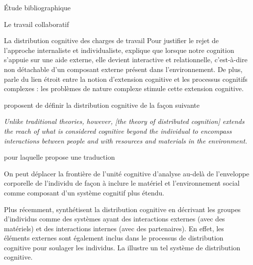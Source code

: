 \documentclass[myfrancais,ngerman,english,frenchb]{mythesis}
\begin{document}
\begin{mychapter}{Étude bibliographique}
\begin{mysection}{Le travail collaboratif}
\begin{mysubsection}{La distribution cognitive des charges de travail}
				Pour justifier le rejet de l'approche internaliste et individualiste,  explique que lorsque notre cognition s'appuie sur une aide externe, elle devient interactive et relationnelle, c'est-à-dire non détachable d'un composant externe présent dans l'environnement.
				De plus,  parle du lien étroit entre la notion d'extension cognitive et les processus cognitifs complexes : les problèmes de nature complexe stimule cette extension cognitive.

				 proposent de définir la distribution cognitive de la façon suivante
				\begin{myquote}[english]
					\it Unlike traditional theories, however, [the theory of distributed cognition] extends the reach of what is considered cognitive beyond the individual to encompass interactions between people and with resources and materials in the environment.
				\end{myquote}
				pour laquelle  propose une traduction
				\begin{myquote}[frenchb]
					On peut déplacer la frontière de l'unité cognitive d'analyse au-delà de l'enveloppe corporelle de l'individu de façon à inclure le matériel et l'environnement social comme composant d'un système cognitif plus étendu.
				\end{myquote}
				Plus récemment,  synthétisent la distribution cognitive en décrivant les groupes d'individus comme des systèmes ayant des interactions externes (avec des matériels)  et des interactions internes (avec des partenaires).
				En effet, les éléments externes sont également inclus dans le processus de distribution cognitive pour soulager les individus.
				La  illustre un tel système de distribution cognitive.


\end{mysubsection}
\end{mysection}
\end{mychapter}
\end{document}
